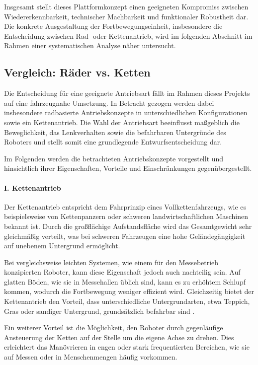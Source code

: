 Insgesamt stellt dieses Plattformkonzept einen geeigneten Kompromiss zwischen Wiedererkennbarkeit, technischer Machbarkeit und funktionaler Robustheit dar. Die konkrete Ausgestaltung der Fortbewegungseinheit, insbesondere die Entscheidung zwischen Rad- oder Kettenantrieb, wird im folgenden Abschnitt im Rahmen einer systematischen Analyse näher untersucht.

\subsection{Vergleich: Räder vs. Ketten}
\label{cha:Vergleich: Räder vs. Ketten}

Die Entscheidung für eine geeignete Antriebsart fällt im Rahmen dieses Projekts auf eine fahrzeugnahe Umsetzung. In Betracht gezogen werden dabei insbesondere radbasierte Antriebskonzepte in unterschiedlichen Konfigurationen sowie ein Kettenantrieb. Die Wahl der Antriebsart beeinflusst maßgeblich die Beweglichkeit, das Lenkverhalten sowie die befahrbaren Untergründe des Roboters und stellt somit eine grundlegende Entwurfsentscheidung dar.

Im Folgenden werden die betrachteten Antriebskonzepte vorgestellt und hinsichtlich ihrer Eigenschaften, Vorteile und Einschränkungen gegenübergestellt.

\paragraph{I. Kettenantrieb}
Der Kettenantrieb entspricht dem Fahrprinzip eines Vollkettenfahrzeugs, wie es beispielsweise von Kettenpanzern oder schweren landwirtschaftlichen Maschinen bekannt ist. Durch die großflächige Aufstandsfläche wird das Gesamtgewicht sehr gleichmäßig verteilt, was bei schweren Fahrzeugen eine hohe Geländegängigkeit auf unebenem Untergrund ermöglicht. \cite{wong2001theory}\cite{siegwart2011introduction}

Bei vergleichsweise leichten Systemen, wie einem für den Messebetrieb konzipierten Roboter, kann diese Eigenschaft jedoch auch nachteilig sein. Auf glatten Böden, wie sie in Messehallen üblich sind, kann es zu erhöhtem Schlupf kommen, wodurch die Fortbewegung weniger effizient wird. Gleichzeitig bietet der Kettenantrieb den Vorteil, dass unterschiedliche Untergrundarten, etwa Teppich, Gras oder sandiger Untergrund, grundsätzlich befahrbar sind \cite{wong2001theory}.

Ein weiterer Vorteil ist die Möglichkeit, den Roboter durch gegenläufige Ansteuerung der Ketten auf der Stelle um die eigene Achse zu drehen. Dies erleichtert das Manövrieren in engen oder stark frequentierten Bereichen, wie sie auf Messen oder in Menschenmengen häufig vorkommen.

